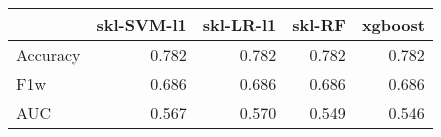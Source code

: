 \begin{tabular}{lrrrr}
\toprule
{} &  skl-SVM-l1 &  skl-LR-l1 &  skl-RF &  xgboost \\
\midrule
Accuracy &       0.782 &      0.782 &   0.782 &    0.782 \\
F1w      &       0.686 &      0.686 &   0.686 &    0.686 \\
AUC      &       0.567 &      0.570 &   0.549 &    0.546 \\
\bottomrule
\end{tabular}
